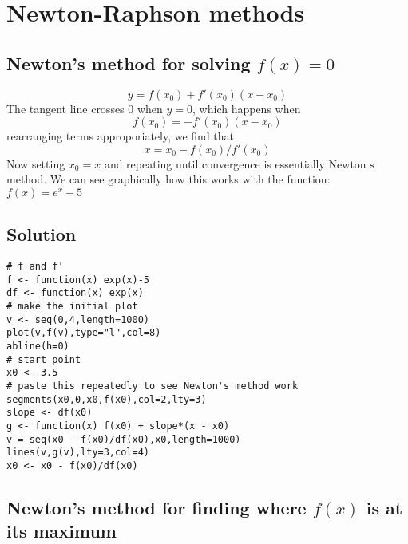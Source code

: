 \documentclass[12pt]{article}
\begin{document}
\section{Newton-Raphson methods}
\subsection*{Newton's method for solving $f(x)=0$}

$$
y=f(x_{0})+f'(x_{0})(x-x_{0})
$$
The tangent line crosses $0$ when $y=0$, which happens when
$$
f(x_{0})=-f'(x_{0})(x-x_{0})
$$
rearranging terms approporiately, we find that
$$
x=x_{0}-f(x_{0})/f'(x_{0})
$$
Now setting $x_{0}=x$ and repeating until convergence is essentially Newton $\mathrm{s}$ method. We can see graphically how this works with the function: $f(x)=e^{x}-5$

\subsection*{Solution}

\begin{verbatim}
# f and f'
f <- function(x) exp(x)-5
df <- function(x) exp(x)
# make the initial plot
v <- seq(0,4,length=1000)
plot(v,f(v),type="l",col=8)
abline(h=0)
# start point
x0 <- 3.5
# paste this repeatedly to see Newton's method work
segments(x0,0,x0,f(x0),col=2,lty=3)
slope <- df(x0)
g <- function(x) f(x0) + slope*(x - x0)
v = seq(x0 - f(x0)/df(x0),x0,length=1000)
lines(v,g(v),lty=3,col=4)
x0 <- x0 - f(x0)/df(x0)
\end{verbatim}

\subsection*{Newton's method for finding where $f(x)$ is at its maximum}
\end{document}
